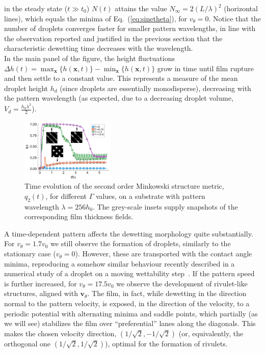 \documentclass[amsmath,amssymb,showpacs,prf,superscriptaddress, longbibliography]{revtex4-1} %
\begin{document}
in the steady state ($t \gg t_0$) $N(t)$ attains the value $N_{\infty} = 2(L/\lambda)^2$ (horizontal lines), which equals the minima of Eq.~(\ref{eq:sinetheta}), for $v_{\theta}=0$.
Notice that the number of droplets converges faster for smaller pattern wavelengths, in line with the observation reported and justified in the previous section that the characteristic dewetting time decreases with the wavelength.\\
In the main panel of the figure, the height fluctuations $\Delta h(t) = \max_{\mathbf{x}}\{h(\mathbf{x},t)\}-\min_{\mathbf{x}}\{h(\mathbf{x},t)\}$ grow in time until film rupture and then settle to a constant value. 
This represents a measure of the mean droplet height $h_d$ (since droplets are essentially monodisperse), decreasing with the pattern wavelength (as expected, due to a decreasing droplet volume,
$V_d = \frac{h_0 \lambda^2}{2}$).\\
\begin{figure}
    \centering
    \includegraphics[width=0.4\textwidth]{Figure_4.pdf}
    \caption{Time evolution of the second order Minkowski structure metric, $q_2(t)$, for different $\Gamma$ values, on a substrate with pattern wavelength $\lambda=256 h_0$.
    The grey-scale insets supply snapshots of the corresponding film thickness fields.}
    \label{fig:msm_q2}
\end{figure}
A time-dependent pattern affects the dewetting morphology quite substantially.
For $v_{\theta} = 1.7 v_0$ we still observe the formation of droplets, similarly to the stationary case ($v_{\theta} = 0$). 
However, these are transported with the contact angle minima, reproducing a somehow similar behaviour recently described in a numerical study of a droplet on a moving wettability step~\cite{grawitterSteeringDropletsSubstrates2021}.
If the pattern speed is further increased, for $v_{\theta} = 17.5 v_0$ we observe the development of rivulet-like structures, aligned with $\mathbf{v}_{\theta}$. 
The film, in fact, while dewetting in the direction normal to the pattern velocity, is exposed, in the direction of the velocity, to a periodic potential with alternating minima and saddle points, which partially (as we will see) stabilizes the film over ``preferential'' lanes along the diagonals. 
This makes the chosen velocity direction, $(1/\sqrt{2},-1/\sqrt{2})$ (or, equivalently, the orthogonal one $(1/\sqrt{2},1/\sqrt{2})$), optimal for the formation of rivulets. 
\end{document}
